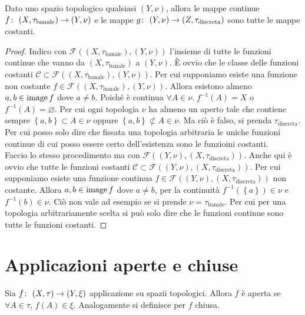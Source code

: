 \begin{theorem}
	Dato uno spazio topologico qualsiasi $(Y,\nu)$, allora le mappe continue $f \colon\ (X,\tau_{\text{banale}}) \rightarrow (Y,\nu)$ e le mappe $g \colon\ (Y,\nu) \rightarrow (Z,\tau_{\text{discreta}})$ sono tutte le mappe costanti.
\end{theorem}
\begin{proof}
	Indico con $\mathcal{F}((X,\tau_{\text{banale}}),(Y,\nu))$ l'insieme di tutte le funzioni continue che vanno da $(X,\tau_{\text{banale}})$ a $(Y,\nu)$. È ovvio che le classe delle funzioni costanti $\mathcal{C} \subset \mathcal{F}((X,\tau_{\text{banale}}),(Y,\nu))$. Per cui supponiamo esiste una funzione non costante $f \in \mathcal{F}((X,\tau_{\text{banale}}),(Y,\nu))$. Allora esistono almeno $a,b \in \operatorname{image}{f}$ dove $a \neq b$. Poiché è continua $\forall A \in \nu . \; f^{-1}(A) = X$ o $f^{-1}(A) = \varnothing$. Per cui ogni topologia $\nu$ ha almeno un aperto tale che contiene sempre $\left\{a,b\right\} \subset A \in \nu$ oppure $\left\{a,b\right\} \not\subset A \in \nu$. Ma ciò è falso, si prenda $\tau_{\text{discreta}}$. Per cui posso solo dire che fissata una topologia arbitraria le uniche funzioni continue di cui posso essere certo dell'esistenza sono le funzioini costanti. \\
	
	Faccio lo stesso procedimento ma con $\mathcal{F}((Y,\nu), (X,\tau_{\text{discreta}}))$. Anche qui è ovvio che tutte le funzioni costanti $\mathcal{C} \subset \mathcal{F}((Y,\nu), (X,\tau_{\text{discreta}}))$. Per cui supponiamo esiste una funzione continua $f \in \mathcal{F}((Y,\nu), (X,\tau_{\text{discreta}}))$ non costante. Allora $a,b \in \operatorname{image}{f}$ dove $a \neq b$, per la continuità $f^{-1}(\left\{a\right\}) \in \nu $ e $f^{-1}(b) \in \nu$. Ciò non vale ad esempio se si prende $\nu = \tau_{\text{banale}}$. Per cui per una topologia arbitrariamente scelta si può solo dire che le funzioni continue sono tutte le funzioni costanti.
\end{proof}

\section{Applicazioni aperte e chiuse}

\begin{definition}
	Sia $f \colon\ (X,\tau) \rightarrow (Y,\xi)$ applicazione su spazii topologici. Allora $f$ è aperta se $\forall A \in \tau$, $f(A) \in \xi$. Analogamente si definisce per $f$ chiusa.
\end{definition}

